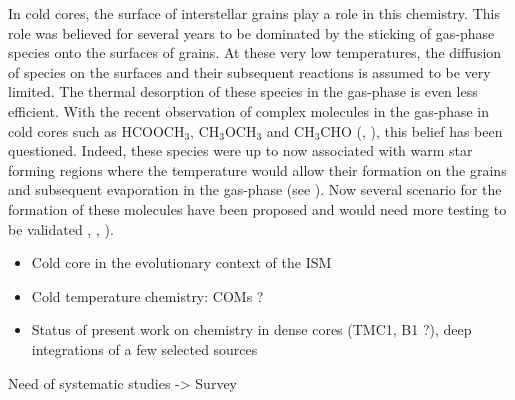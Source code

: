 In cold cores, the surface of interstellar grains play a role in this chemistry. This role was believed for several years to be dominated by the sticking of gas-phase species onto the surfaces of grains. At these very low temperatures, the diffusion of species on the surfaces and their subsequent reactions is assumed to be very limited. The thermal desorption of these species in the gas-phase is even less efficient. With the recent observation of complex molecules in the gas-phase in cold cores such as HCOOCH$_3$, CH$_3$OCH$_3$ and CH$_3$CHO (\cite{Bacmann_2012}, \cite{2014ApJ...795L...2V}), this belief has been questioned. Indeed, these species were up to now associated with warm star forming regions where the temperature would allow their formation on the grains and subsequent evaporation in the gas-phase (see \cite{Herbst_2009}). Now several scenario for the formation of these molecules have been proposed and would need more testing to be validated \cite{Vasyunin_2013}, \cite{2015MNRAS.449L..16B}, \cite{2015MNRAS.447.4004R}). 



\begin{itemize}
\item{Cold core in the evolutionary context of the ISM}
\item{Cold temperature chemistry: COMs ?}
\item{Status of present work on chemistry in dense cores (TMC1, B1 ?), deep integrations of a few selected sources}
\end{itemize}
Need of systematic studies -> Survey
  
  
  
  
  
  
  
  
  
  
  